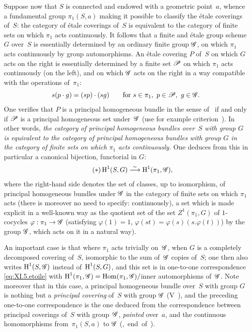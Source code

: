 Suppose now that $S$ is connected and endowed with a geometric
point~$a$, whence a fundamental group $\pi_1(S,a)$
making it possible to classify the \'etale coverings of~$S$: the
category of \'etale coverings of~$S$ is
equivalent to the category of finite sets on which
$\pi_1$ acts continuously. It follows that a finite and \'etale group
scheme $G$ over~$S$ is
essentially determined by an ordinary finite group $\cal{G}$, on which
$\pi_1$ acts continuously by group automorphisms. An
\'etale covering $P$ of~$S$ on which $G$ acts on the right
is essentially determined by a finite set $\cal{P}$
on which $\pi_1$ acts continuously (on the left), and on which
$\cal{G}$ acts on the right in a way compatible with the
operations of~$\pi_1$:
$$
s(p\cdot g)=(sp)\cdot(sg)\qquad \text{for }s\in\pi_1,\
p\in\cal{P},\ g\in\cal{G}.
$$
One verifies that $P$ is a principal homogeneous bundle in the sense
of~\Ref{XI.4.1} if and only if $\cal{P}$ is a principal
homogeneous set under~$\cal{G}$ (use for example
criterion~). In other words, \emph{the category
of principal homogeneous bundles over~$S$ with group $G$ is
equivalent to the category of principal
homogeneous bundles with group $G$ in the category of finite sets
on which $\pi_1$ acts continuously.} One deduces from this in
particular a canonical bijection, functorial in $G$:
\begin{equation*}
\label{eq:XI.5.etoile}
\tag{$*$} \H^1(S,G)\isomto \H^1(\pi_1,\cal{G})\quoi,
\end{equation*}
where
the right-hand side denotes the set of classes, up to
isomorphism, of principal homogeneous bundles under
$\cal{G}$ in the category of finite sets on which $\pi_1$
acts (there is moreover no need to specify: continuously),
a set which is made explicit in a well-known way as the
quotient set of the set $Z^1(\pi_1,G)$ of $1$-cocycles
$\varphi:\pi_1\to \cal{G}$ (satisfying $\varphi(1)=1$,
$\varphi(st)=\varphi(s)(s.\varphi(t))$) by the group $\cal{G}$, which
acts on it in a natural way).

\label{page-300}
An important case is that where $\pi_1$ acts trivially on~$\cal{G}$, \ie when $G$ is a completely
decomposed covering of~$S$, isomorphic to the sum of~$\cal{G}$
copies of~$S$; one then also writes $\H^1(S,\cal{G})$ instead
of~$\operatorname{H}^1(S,G)$, and this set is in one-to-one correspondence
\eqref{eq:XI.5.etoile} with $\H^1(\pi_1,\cal G)= \Hom(\pi_1,\cal{G})/$inner automorphisms of~$\cal{G}$. Note moreover that in this case, a principal
homogeneous bundle over~$S$ with group $G$ is nothing but a
\emph{principal covering} of~$S$ with group $\cal{G}$
(V~), and the preceding one-to-one correspondence
is the one deduced from the correspondence between principal
coverings of~$S$ with group~$\cal{G}$, \emph{pointed} over~$a$, and the continuous homomorphisms from~$\pi_1(S,a)$ to $\cal{G}$
(\Ref{V},~end~of~\No \Ref{V.5}).

